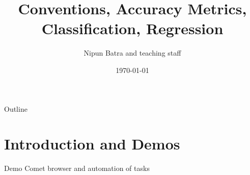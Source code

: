 \documentclass[usenames,dvipsnames]{beamer}
\title{Conventions, Accuracy Metrics, Classification, Regression}
\date{\today}
\author{Nipun Batra and teaching staff}
\institute{IIT Gandhinagar}
\begin{document}
%

  \makeatletter
  \makeatother
  \setcounter{popquiz}{0}

  \maketitle
  
  \begin{frame}{Outline}
    \tableofcontents
  \end{frame}
  
  \section{Introduction and Demos}
  
  \begin{frame}{Demo}
	Comet browser and automation of tasks
  \end{frame}
  
\end{document}
